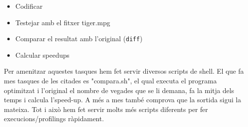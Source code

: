 \begin{itemize}
  \item Codificar
  \item Testejar amb el fitxer tiger.mpg
  \item Comparar el resultat amb l'original (\texttt{diff})
  \item Calcular speedups
\end{itemize}

Per amenitzar aquestes tasques hem fet servir diversos scripts de shell. El que fa mes tasques de les citades es "compara.sh", el qual executa el programa optimitzat i l'original el nombre de vegades que se li demana, fa la mitja dels temps i calcula l'speed-up. A més a mes també comprova que la sortida sigui la mateixa. Tot i això hem fet servir molts més scripts diferents per fer execucions/profilings ràpidament.
